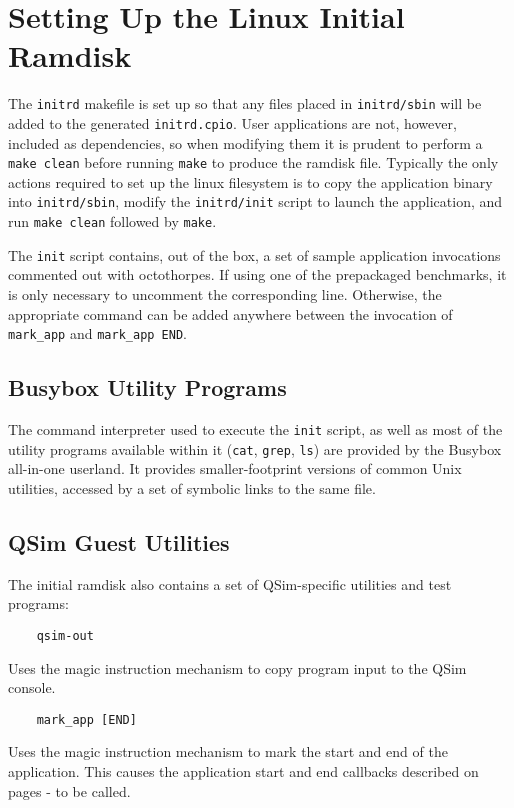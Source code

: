 \documentclass[letterpaper, 10pt]{book}
\begin{document}
\section{Setting Up the Linux Initial Ramdisk}
The \texttt{initrd} makefile is set up so that any files placed in 
\texttt{initrd/sbin} will be added to the generated \texttt{initrd.cpio}. User
applications are not, however, included as dependencies, so when modifying them
it is prudent to perform a \texttt{make clean} before running \texttt{make} to
produce the ramdisk file. Typically the only actions required to set up the
linux filesystem is to copy the application binary into \texttt{initrd/sbin},
modify the \texttt{initrd/init} script to launch the application, and run
\texttt{make clean} followed by \texttt{make}.

The \texttt{init} script contains, out of the box, a set of sample application
invocations commented out with octothorpes. If using one of the prepackaged
benchmarks, it is only necessary to uncomment the corresponding line. 
Otherwise, the appropriate command can be added anywhere between the invocation
of \texttt{mark\_app} and \texttt{mark\_app END}.

\subsection{Busybox Utility Programs}
The command interpreter used to execute the \texttt{init} script, as well as
most of the utility programs available within it (\texttt{cat}, \texttt{grep},
\texttt{ls}) are provided by the Busybox all-in-one userland.
It provides smaller-footprint versions of common Unix utilities, accessed by a
set of symbolic links to the same file.

\subsection{QSim Guest Utilities}
The initial ramdisk also contains a set of QSim-specific utilities and test
programs:

\begin{verbatim}
    qsim-out
\end{verbatim}
Uses the magic instruction mechanism to copy program input to the QSim console.

\begin{verbatim}
    mark_app [END]
\end{verbatim}
Uses the magic instruction mechanism to mark the start and end of the
application. This causes the application start and end callbacks described on
pages \pageref{func:set_app_start_cb}-\pageref{tf:set_app_end_cb} to be called.
\end{document}
